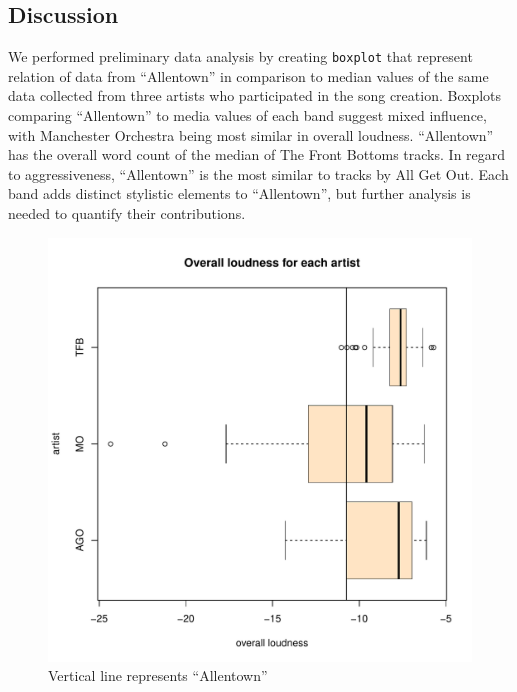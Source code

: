 \documentclass{article}\usepackage[]{graphicx}\usepackage[]{xcolor}
\makeatletter
\def\maxwidth{ %
  \ifdim\Gin@nat@width>\linewidth
    \linewidth
  \else
    \Gin@nat@width
  \fi
}
\newenvironment{knitrout}{}{} %
\makeatother
\begin{document}
\begin{multicols}{2}
\section{Discussion}
We performed preliminary data analysis by creating \texttt{boxplot} that represent relation of data from ``Allentown'' in comparison to median values of the same data collected from three artists who participated in the song creation. 
Boxplots comparing ``Allentown'' to media values of each band suggest mixed influence, with Manchester Orchestra being most similar in overall loudness. ``Allentown'' has the overall word count of the median of The Front Bottoms tracks. In regard to aggressiveness, ``Allentown'' is the most similar to tracks by All Get Out. Each band adds distinct stylistic elements to ``Allentown'', but further analysis is needed to quantify their contributions.













\begin{figure}[H]
\begin{knitrout}\scriptsize
{}\color{fgcolor}
\includegraphics[width=\maxwidth]{figure/unnamed-chunk-3-1} 
\end{knitrout}
\caption{Vertical line represents ``Allentown''} \label{plot1}
\end{figure}


\end{multicols}
\end{document}
